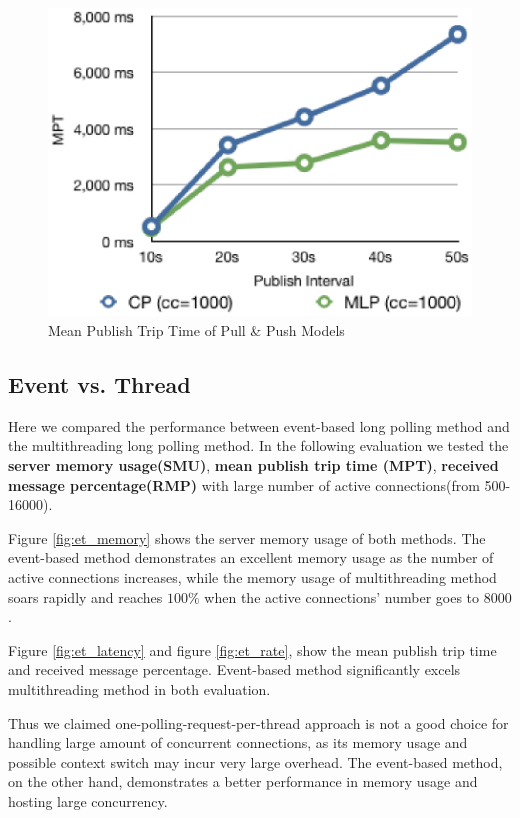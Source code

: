 \begin{figure}[htb!]
\centering%
    \includegraphics[scale=0.70]{figures/latency.eps}
    \caption{Mean Publish Trip Time of Pull \& Push Models}
    \label{fig:traffic_latency}
\end{figure}

\subsection{Event vs. Thread\\}

Here we compared the performance between event-based long polling method
and the multithreading long polling method. In the following evaluation
we tested the {\bf server memory usage(SMU)}, {\bf mean publish trip time
(MPT)}, {\bf received message percentage(RMP)} with large number of
active connections(from 500-16000).

Figure \ref{fig:et_memory} shows the server memory usage of both methods.
The event-based method demonstrates an excellent memory usage as the
number of active connections increases, while the memory usage of 
multithreading method soars rapidly and reaches $100\%$ when the active
connections' number goes to $8000$.

Figure \ref{fig:et_latency} and figure \ref{fig:et_rate}, show the mean
publish trip time and received message percentage. Event-based method 
significantly excels multithreading method in both evaluation.

Thus we claimed one-polling-request-per-thread approach is not a good 
choice for handling large amount of concurrent connections, as its
memory usage and possible context switch may incur very large overhead.
The event-based method, on the other hand, demonstrates a better 
performance in memory usage and hosting large concurrency.  

